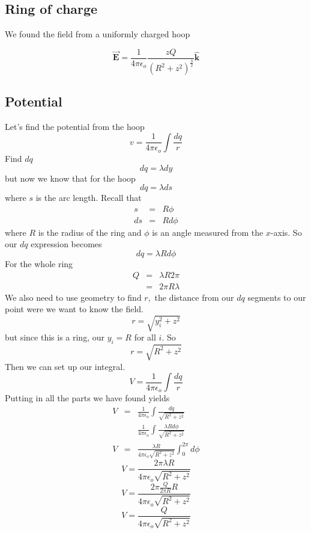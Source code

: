 \documentclass{article}
\begin{document}
\subsection{Ring of charge}


We found the field from a uniformly charged hoop

\[
\overrightarrow{\mathbf{E}}=\frac{1}{4\pi \epsilon _{o}}\frac{zQ}{\left(
R^{2}+z^{2}\right) ^{\frac{3}{2}}}\mathbf{\hat{k}}
\]

\subsection{Potential}

Let's find the potential from the hoop%
\[
v=\frac{1}{4\pi \epsilon _{o}}\int \frac{dq}{r}
\]%
Find $dq$%
\[
dq=\lambda dy
\]%
but now we know that for the hoop 
\[
dq=\lambda ds
\]%
where $s$ is the arc length. Recall that 
\begin{eqnarray*}
s &=&R\phi  \\
ds &=&Rd\phi 
\end{eqnarray*}%
where $R$ is the radius of the ring and $\phi $ is an angle measured from
the $x$-axis. So our $dq$ expression becomes 
\[
dq=\lambda Rd\phi 
\]%
For the whole ring 
\begin{eqnarray*}
Q &=&\lambda R2\pi  \\
&=&2\pi R\lambda 
\end{eqnarray*}%
We also need to use geometry to find $r,$ the distance from our $dq$
segments to our point were we want to know the field.%
\[
r=\sqrt{y_{i}^{2}+z^{2}}
\]%
but since this is a ring, our $y_{i}=R$ for all $i.$ So%
\[
r=\sqrt{R^{2}+z^{2}}
\]%
Then we can set up our integral.%
\[
V=\frac{1}{4\pi \epsilon _{o}}\int \frac{dq}{r}
\]%
Putting in all the parts we have found yields%
\begin{eqnarray*}
V &=&\frac{1}{4\pi \epsilon _{o}}\int \frac{dq}{\sqrt{R^{2}+z^{2}}} \\
&&\frac{1}{4\pi \epsilon _{o}}\int \frac{\lambda Rd\phi }{\sqrt{R^{2}+z^{2}}}
\\
V &=&\frac{\lambda R}{4\pi \epsilon _{o}\sqrt{R^{2}+z^{2}}}\int_{0}^{2\pi
}d\phi 
\end{eqnarray*}%
\[
V=\frac{2\pi \lambda R}{4\pi \epsilon _{o}\sqrt{R^{2}+z^{2}}}
\]%
\[
V=\frac{2\pi \frac{Q}{2\pi R}R}{4\pi \epsilon _{o}\sqrt{R^{2}+z^{2}}}
\]%
\[
V=\frac{Q}{4\pi \epsilon _{o}\sqrt{R^{2}+z^{2}}}
\]
\end{document}
